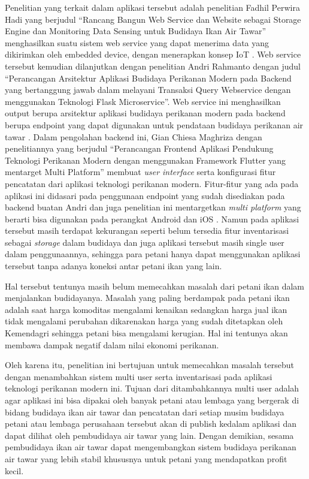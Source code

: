 Penelitian yang terkait dalam aplikasi tersebut adalah penelitian Fadhil Perwira Hadi yang berjudul “Rancang Bangun Web Service dan Website sebagai Storage Engine dan Monitoring Data Sensing untuk Budidaya Ikan Air Tawar” menghasilkan suatu sistem web service yang dapat menerima data yang dikirimkan oleh embedded device, dengan menerapkan konsep IoT \citep{fadhil2021}. Web service tersebut kemudian dilanjutkan dengan penelitian Andri Rahmanto dengan judul “Perancangan Arsitektur Aplikasi Budidaya Perikanan Modern pada Backend yang bertanggung jawab dalam melayani Transaksi Query Webservice dengan menggunakan Teknologi Flask Microservice”. Web service ini menghasilkan output berupa arsitektur aplikasi budidaya perikanan modern pada backend berupa endpoint yang dapat digunakan untuk pendataan budidaya perikanan air tawar \citep{andri2022}. Dalam pengolahan backend ini, Gian Chiesa Maghriza dengan penelitiannya yang berjudul “Perancangan Frontend Aplikasi Pendukung Teknologi Perikanan Modern dengan menggunakan Framework Flutter yang mentarget Multi Platform” membuat \textit{user interface} serta konfigurasi fitur pencatatan dari aplikasi teknologi perikanan modern. Fitur-fitur yang ada pada aplikasi ini didasari pada penggunaan endpoint yang sudah disediakan pada backend buatan Andri dan juga penelitian ini mentargetkan \textit{multi platform} yang berarti bisa digunakan pada perangkat Android dan iOS \citep{gian2022}. Namun pada aplikasi tersebut masih terdapat kekurangan seperti belum tersedia fitur inventarisasi sebagai \textit{storage} dalam budidaya dan juga aplikasi tersebut masih single user dalam penggunaannya, sehingga para petani hanya dapat menggunakan aplikasi tersebut tanpa adanya koneksi antar petani ikan yang lain.

Hal tersebut tentunya masih belum memecahkan masalah dari petani ikan dalam menjalankan budidayanya. Masalah yang paling berdampak pada petani ikan adalah saat harga komoditas mengalami kenaikan sedangkan harga jual ikan tidak mengalami perubahan dikarenakan harga yang sudah ditetapkan oleh Kemendagri sehingga petani bisa mengalami kerugian. Hal ini tentunya akan membawa dampak negatif dalam nilai ekonomi perikanan.

Oleh karena itu, penelitian ini bertujuan untuk memecahkan masalah tersebut dengan menambahkan sistem multi user serta inventarisasi pada aplikasi teknologi perikanan modern ini. Tujuan dari ditambahkannya multi user adalah agar aplikasi ini bisa dipakai oleh banyak petani atau lembaga yang bergerak di bidang budidaya ikan air tawar dan pencatatan dari setiap musim budidaya petani atau lembaga perusahaan tersebut akan di publish kedalam aplikasi dan dapat dilihat oleh pembudidaya air tawar yang lain. Dengan demikian, sesama pembudidaya ikan air tawar dapat mengembangkan sistem budidaya perikanan air tawar yang lebih stabil khususnya untuk petani yang mendapatkan profit kecil. 

